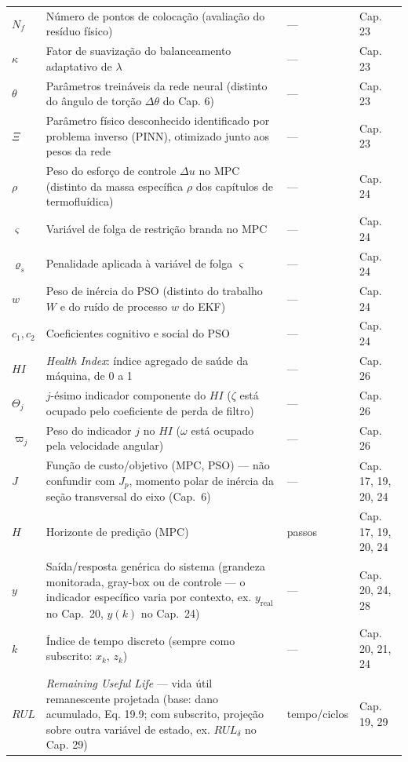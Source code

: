 \documentclass[12pt,a4paper]{article}
\numberwithin{equation}{section}
\numberwithin{table}{section}
\numberwithin{figure}{section}
\begin{document}
{\begin{longtable}{>{\raggedright\arraybackslash}p{2.8cm} >{\raggedright\arraybackslash}p{5.3cm} >{\raggedright\arraybackslash}p{2.1cm} >{\raggedright\arraybackslash}p{4.2cm}}
	$N_f$ & Número de pontos de colocação (avaliação do resíduo físico) & --- & Cap. 23 \\
	$\kappa$ & Fator de suavização do balanceamento adaptativo de $\lambda$ & --- & Cap. 23 \\
	$\theta$\dag & Parâmetros treináveis da rede neural (distinto do ângulo de torção $\Delta\theta$ do Cap. 6) & --- & Cap. 23 \\
	$\Xi$ & Parâmetro físico desconhecido identificado por problema inverso (PINN), otimizado junto aos pesos da rede & --- & Cap. 23 \\
	$\rho$\dag & Peso do esforço de controle $\Delta u$ no MPC (distinto da massa específica $\rho$ dos capítulos de termofluídica) & --- & Cap. 24 \\
	$\varsigma$ & Variável de folga de restrição branda no MPC & --- & Cap. 24 \\
	$\varrho_s$ & Penalidade aplicada à variável de folga $\varsigma$ & --- & Cap. 24 \\
	$w$\dag & Peso de inércia do PSO (distinto do trabalho $W$ e do ruído de processo $w$ do EKF) & --- & Cap. 24 \\
	$c_1, c_2$ & Coeficientes cognitivo e social do PSO & --- & Cap. 24 \\
	$HI$ & \textit{Health Index}: índice agregado de saúde da máquina, de 0 a 1 & --- & Cap. 26 \\
	$\Theta_j$\dag & $j$-ésimo indicador componente do $HI$ ($\zeta$ está ocupado pelo coeficiente de perda de filtro) & --- & Cap. 26 \\
	$\varpi_j$\dag & Peso do indicador $j$ no $HI$ ($\omega$ está ocupado pela velocidade angular) & --- & Cap. 26 \\
	$J$ & Função de custo/objetivo (MPC, PSO) — não confundir com $J_p$, momento polar de inércia da seção transversal do eixo (Cap.~6) & --- & Cap. 17, 19, 20, 24 \\
	$H$ & Horizonte de predição (MPC) & passos & Cap. 17, 19, 20, 24 \\
	$y$ & Saída/resposta genérica do sistema (grandeza monitorada, gray-box ou de controle — o indicador específico varia por contexto, ex. $y_{\text{real}}$ no Cap.~20, $y(k)$ no Cap.~24) & --- & Cap. 20, 24, 28 \\
	$k$ & Índice de tempo discreto (sempre como subscrito: $x_k$, $z_k$) & --- & Cap. 20, 21, 24 \\
	$RUL$ & \textit{Remaining Useful Life} — vida útil remanescente projetada (base: dano acumulado, Eq. 19.9; com subscrito, projeção sobre outra variável de estado, ex. $RUL_\delta$ no Cap. 29) & tempo/ciclos & Cap. 19, 29 \\

\end{longtable}}
\end{document}
